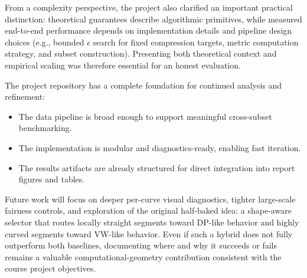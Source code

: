 \documentclass[12pt]{article}
\begin{document}
From a complexity perspective, the project also clarified an important practical distinction: theoretical guarantees describe algorithmic primitives, while measured end-to-end performance depends on implementation details and pipeline design choices (e.g., bounded $\epsilon$ search for fixed compression targets, metric computation strategy, and subset construction). Presenting both theoretical context and empirical scaling was therefore essential for an honest evaluation.

The project repository has a complete foundation for continued analysis and refinement:
\begin{itemize}
    \item The data pipeline is broad enough to support meaningful cross-subset benchmarking.
    \item The implementation is modular and diagnostics-ready, enabling fast iteration.
    \item The results artifacts are already structured for direct integration into report figures and tables.
\end{itemize}

Future work will focus on deeper per-curve visual diagnostics, tighter large-scale fairness controls, and exploration of the original half-baked idea: a shape-aware selector that routes locally straight segments toward DP-like behavior and highly curved segments toward VW-like behavior. Even if such a hybrid does not fully outperform both baselines, documenting where and why it succeeds or fails remains a valuable computational-geometry contribution consistent with the course project objectives.
\end{document}
